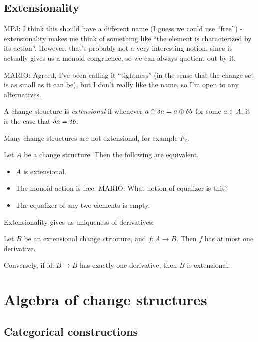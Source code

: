 \subsection{Extensionality}

MPJ: I think this should have a different name (I guess we could use ``free'') -
extensionality makes me think of something like ``the element is characterized
by its action''.
However, that's probably not a very interesting notion, since it actually gives us a
monoid congruence, so we can always quotient out by it.

MARIO: Agreed, I've been calling it ``tightness'' (in the sense that the change set
is as small as it can be), but I don't really like the name, so I'm open to any
alternatives.

\begin{defn}[Extensionality]
  A change structure is \textit{extensional} if whenever $a \oplus \delta a
  = a \oplus \delta b$ for some $a \in A$, it is the case that $\delta a = \delta b$.
\end{defn}

Many change structures are not extensional, for example $F_2$.

\begin{prop}
  Let $A$ be a change structure. Then the following are equivalent.
  \begin{itemize}
    \item $A$ is extensional.
    \item The monoid action is free.
    MARIO: What notion of equalizer is this?
    \item The equalizer of any two elements is empty.
  \end{itemize}
\end{prop}

Extensionality gives us uniqueness of derivatives:
\begin{prop}
  Let $B$ be an extensional change structure, and $f: A \rightarrow B$. Then $f$ has at
  most one derivative.

  Conversely, if $\textrm{id}: B \rightarrow B$ has exactly one derivative, then
  $B$ is extensional.
\end{prop}

\section{Algebra of change structures}
\label{sec:algebra}

\subsection{Categorical constructions}

